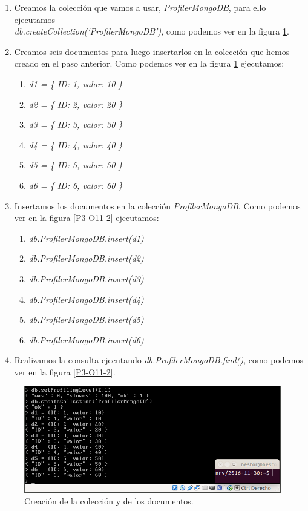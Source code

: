 \documentclass[a4paper,titlepage,12pt]{report}	%
\numberwithin{figure}{section} %
\numberwithin{table}{section} %
\begin{document}
	\begin{enumerate}
	   \label{P3-proceso_mongoDB}
	   \item Creamos la colección que vamos a usar, \textit{ProfilerMongoDB}, para ello ejecutamos \\ \textit{db.createCollection(`ProfilerMongoDB')}, como podemos ver en la figura \ref{P3-O11-1}.
	   \item Creamos seis documentos para luego insertarlos en la colección que hemos creado en el paso anterior. Como podemos ver en la figura \ref{P3-O11-1} ejecutamos:
	   \begin{enumerate}
	      \item \textit{d1 = \{ ID: 1, valor: 10 \}}
	      \item \textit{d2 = \{ ID: 2, valor: 20 \}}
	      \item \textit{d3 = \{ ID: 3, valor: 30 \}}
	      \item \textit{d4 = \{ ID: 4, valor: 40 \}}
	      \item \textit{d5 = \{ ID: 5, valor: 50 \}}
	      \item \textit{d6 = \{ ID: 6, valor: 60 \}}
	   \end{enumerate}
	   \item Insertamos los documentos en la colección \textit{ProfilerMongoDB}. Como podemos ver en la figura \ref{P3-O11-2} ejecutamos:
	   \begin{enumerate}
	      \item \textit{db.ProfilerMongoDB.insert(d1)}
	      \item \textit{db.ProfilerMongoDB.insert(d2)}
	      \item \textit{db.ProfilerMongoDB.insert(d3)}
	      \item \textit{db.ProfilerMongoDB.insert(d4)}
	      \item \textit{db.ProfilerMongoDB.insert(d5)}
	      \item \textit{db.ProfilerMongoDB.insert(d6)}
	   \end{enumerate}
	   \item Realizamos la consulta ejecutando \textit{db.ProfilerMongoDB.find()}, como podemos ver en la figura \ref{P3-O11-2}.
	\end{enumerate}

	\begin{figure}[H]
	   \includegraphics[width=\linewidth]{./Imagenes/P3/O11-1.png}
	   \vspace{-0.5cm}
	   \caption[Creación de la colección y de los documentos.]{Creación de la colección y de los documentos.}
	   \label{P3-O11-1}
	\end{figure}
\end{document}
